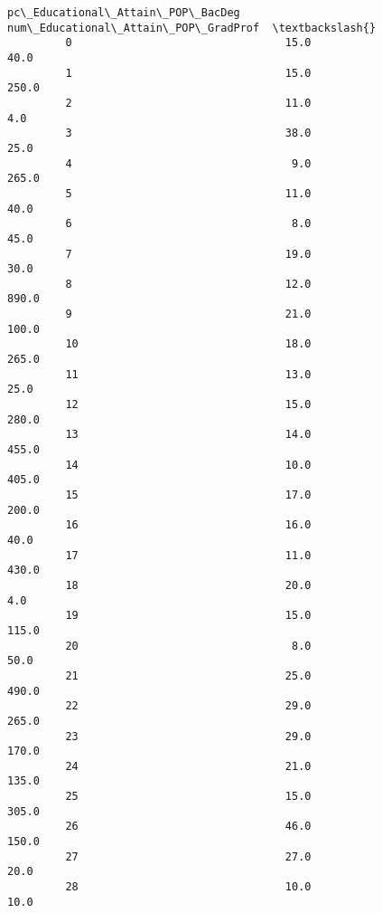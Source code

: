 \documentclass[11pt]{article}
\begin{document}
\begin{Verbatim}[commandchars=\\\{\}]
               pc\_Educational\_Attain\_POP\_BacDeg num\_Educational\_Attain\_POP\_GradProf  \textbackslash{}
         0                                 15.0                                40.0   
         1                                 15.0                               250.0   
         2                                 11.0                                 4.0   
         3                                 38.0                                25.0   
         4                                  9.0                               265.0   
         5                                 11.0                                40.0   
         6                                  8.0                                45.0   
         7                                 19.0                                30.0   
         8                                 12.0                               890.0   
         9                                 21.0                               100.0   
         10                                18.0                               265.0   
         11                                13.0                                25.0   
         12                                15.0                               280.0   
         13                                14.0                               455.0   
         14                                10.0                               405.0   
         15                                17.0                               200.0   
         16                                16.0                                40.0   
         17                                11.0                               430.0   
         18                                20.0                                 4.0   
         19                                15.0                               115.0   
         20                                 8.0                                50.0   
         21                                25.0                               490.0   
         22                                29.0                               265.0   
         23                                29.0                               170.0   
         24                                21.0                               135.0   
         25                                15.0                               305.0   
         26                                46.0                               150.0   
         27                                27.0                                20.0   
         28                                10.0                                10.0   

\end{Verbatim}
\end{document}
